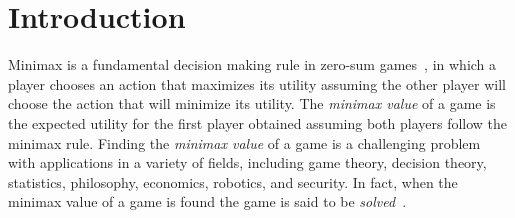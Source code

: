 \documentclass[letterpaper]{article} %
\begin{document}
\begin{abstract}

\end{abstract}




\section{Introduction}


Minimax is a fundamental decision making rule in zero-sum games~\cite{wald1945statistical}, 
in which a player chooses an action that maximizes its utility assuming the other player will 
choose the action that will minimize its utility. The \emph{minimax value} of a game is the expected utility for the first player obtained assuming both players follow the minimax rule. 
Finding the \emph{minimax value} of a game is a challenging problem with applications in a variety of fields, including game theory, decision theory,  statistics, philosophy, economics, robotics, and security. 
In fact, when the minimax value of a game is found the game is said to be \emph{solved}~\cite{schaeffer2007checkers,irving2000solving,saffidine2011solving}. 
\end{document}
